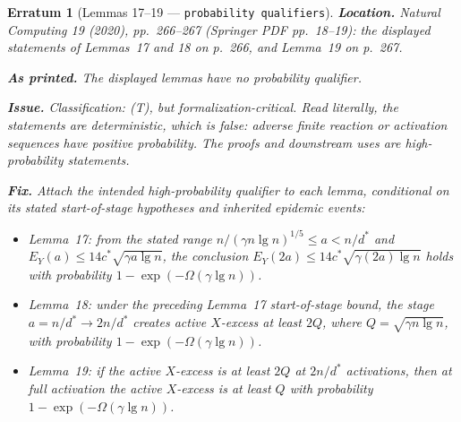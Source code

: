 \documentclass[11pt]{article}
\theoremstyle{erratumstyle}
\newtheorem{erratum}{Erratum}
\begin{document}
\begin{erratum}[Lemmas 17--19 --- \texttt{probability qualifiers}]
\textbf{Location.} \emph{Natural Computing} 19 (2020), pp.~266--267
(Springer PDF pp.~18--19): the displayed statements of Lemmas~17 and 18 on
p.~266, and Lemma~19 on p.~267.

\medskip
\textbf{As printed.} The displayed lemmas have no probability qualifier.

\medskip
\textbf{Issue.} Classification: (T), but formalization-critical. Read
literally, the statements are deterministic, which is false: adverse finite
reaction or activation sequences have positive probability. The proofs and
downstream uses are high-probability statements.

\medskip
\textbf{Fix.} Attach the intended high-probability qualifier to each lemma,
conditional on its stated start-of-stage hypotheses and inherited epidemic
events:
\begin{itemize}
\item Lemma~17: from the stated range
$n/(\gamma n\lg n)^{1/5}\le a<n/d^*$ and
$E_Y(a)\le 14c^*\sqrt{\gamma a\lg n}$, the conclusion
$E_Y(2a)\le 14c^*\sqrt{\gamma(2a)\lg n}$ holds with probability
$1-\exp(-\Omega(\gamma\lg n))$.
\item Lemma~18: under the preceding Lemma~17 start-of-stage bound, the stage
$a=n/d^*\to 2n/d^*$ creates active $X$-excess at least
$2Q$, where $Q=\sqrt{\gamma n\lg n}$, with probability
$1-\exp(-\Omega(\gamma\lg n))$.
\item Lemma~19: if the active $X$-excess is at least $2Q$ at
$2n/d^*$ activations, then at full activation the active $X$-excess is at
least $Q$ with probability $1-\exp(-\Omega(\gamma\lg n))$.
\end{itemize}
\end{erratum}
\end{document}

